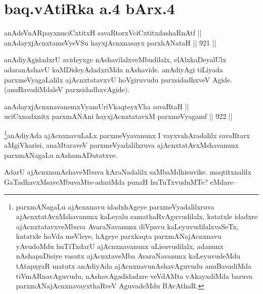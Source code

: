 \section*{baq.vAtiRka a.4 bArx.4}


\begin{shl}
anAdeVnARpayxnuciCxtitxH savaRtorxVciCxtitxdashaRnAtf || \\
anAdayxjAcnxtameVyeVSu hayxjAcnxnasayx parxhANataH ||  921 ||  
\end{shl}

\begin{artha}
anAdiyAgidadxrU avideyxge nAshavilalxveMbudilalx, elAlxkaDeyalUlx adaranAshavU kaMDideyAdadxriMda nAshavide. anAdiyAgi tiLiyada parxmeVyagaLalilx ajAcnxtatavxvU hoVgiruvudu parxsidadhxveV Agide.(anuBavadiMdaleV parxsidadhxvAgide).
\end{artha}


\begin{shl}
anAdayxjAcnxnavanemxVyamUriVkaqteyxVha savaRtaH || \\
uciCxnadxnitx parxmANAni hayxjAcnxtatavxM parxmeVyagamf ||  922 ||  
\end{shl}

\begin{artha}
\footnote{parxmANagaLu ajAcnxnavu idadxhAgeye parxmeVyadalilxruva ajAcnxtatAvxMshavanunx kaLeyalu samathaRvAguvudilalx, katatxle idadxre ajAcnxtatavxveMbuva AvaraNavanunx diVpavu kaLeyuvudilalxvaSeTx, katatxle hoVda meVleye, hAgeye parxkaqta parxmANajAcnxnavu yAvudoMdu huTiTxdarU ajAcnxnavanunx uLisuvudilalx, adanunx nAshapaDisiye vasutx ajAcnxtaveMba AvaraNavanunx kaLeyuvudeMdu tAtapxyaR matutx anAdiyAda ajAcnxnavunAshavAguvudu anuBavadiMda tiVmARnavAguvudu, nAshavAgadidadxre veVdAMta vAkayxdiMda baruva parxmANajAcnxnavayxthaRveV AguvadeMdu BAvAthaR.}anAdiyAda ajAcnxnavuLaLx parxmeVyavanunx I vayxvahAradalilx savaRtarx aMgiVkarisi, anaMtaraveV parxmeVyadalilxruva ajAcnxtatAvxMshavanunx parxmANagaLu nAshamADutatxve.
\end{artha}

\begin{artha}
AdarU ajAcnxnanAshaveMbuva kAraNadalilx saMbaMdhisuvike. maqtitxnalilx GaTadhavxMsaveMbuvaMte-adariMda punaH huTuTxvuduMTe? eMdare--
\end{artha}

